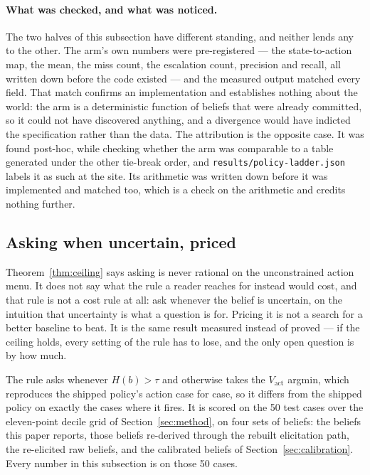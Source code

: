 \documentclass{article}
\begin{document}
\paragraph{What was checked, and what was noticed.} The two halves of this subsection
have different standing, and neither lends any to the other. The arm's own numbers
were pre-registered --- the state-to-action map, the mean, the miss count, the
escalation count, precision and recall, all written down before the code existed ---
and the measured output matched every field. That match confirms an implementation
and establishes nothing about the world: the arm is a deterministic function of
beliefs that were already committed, so it could not have discovered anything, and a
divergence would have indicted the specification rather than the data. The
attribution is the opposite case. It was found post-hoc, while checking whether the
arm was comparable to a table generated under the other tie-break order, and
\texttt{results/policy-ladder.json} labels it as such at the site. Its arithmetic was
written down before it was implemented and matched too, which is a check on the
arithmetic and credits nothing further.

\subsection{Asking when uncertain, priced}
\label{sec:entropy}
Theorem~\ref{thm:ceiling} says asking is never rational on the unconstrained action
menu. It does not say what the rule a reader reaches for instead would cost, and
that rule is not a cost rule at all: ask whenever the belief is uncertain, on the
intuition that uncertainty is what a question is for. Pricing it is not a search for
a better baseline to beat. It is the same result measured instead of proved --- if
the ceiling holds, every setting of the rule has to lose, and the only open question
is by how much.

The rule asks whenever $H(b) > \tau$ and otherwise takes the $V_{\text{act}}$
argmin, which reproduces the shipped policy's action case for case, so it differs
from the shipped policy on exactly the cases where it fires. It is scored on the 50
test cases over the eleven-point decile grid of Section~\ref{sec:method}, on four
sets of beliefs: the beliefs this paper reports, those beliefs re-derived through
the rebuilt elicitation path, the re-elicited raw beliefs, and the calibrated
beliefs of Section~\ref{sec:calibration}. Every number in this subsection is on
those 50 cases.
\end{document}
